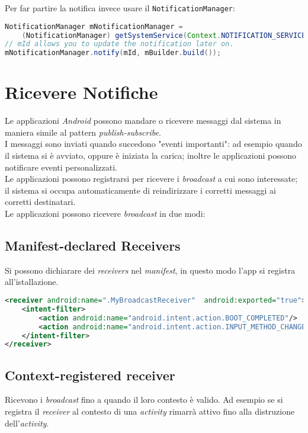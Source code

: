 Per far partire la notifica invece usare il \texttt{NotificationManager}:
\begin{lstlisting}[language=Java]
NotificationManager mNotificationManager =
    (NotificationManager) getSystemService(Context.NOTIFICATION_SERVICE);
// mId allows you to update the notification later on.
mNotificationManager.notify(mId, mBuilder.build());

\end{lstlisting}

\section{Ricevere Notifiche}
Le applicazioni \textit{Android} possono mandare o ricevere messaggi dal sistema in maniera simile al pattern \textit{publish-subscribe}.\\
I messaggi sono inviati quando succedono "eventi importanti": ad esempio quando il sistema si è avviato, oppure è iniziata la carica; inoltre le applicazioni possono notificare eventi personalizzati.\\
Le applicazioni possono registrarsi per ricevere i \textit{broadcast} a cui sono interessate; il sistema si occupa automaticamente di reindirizzare i corretti messaggi ai corretti destinatari.\\
Le applicazioni possono ricevere \textit{broadcast} in due modi:

\subsection{Manifest-declared Receivers}
Si possono dichiarare dei \textit{receivers} nel \textit{manifest}, in questo modo l'app si registra all'istallazione.
\begin{lstlisting}[language=XML]
<receiver android:name=".MyBroadcastReceiver"  android:exported="true">
    <intent-filter>
        <action android:name="android.intent.action.BOOT_COMPLETED"/>
        <action android:name="android.intent.action.INPUT_METHOD_CHANGED" />
    </intent-filter>
</receiver> 
\end{lstlisting}


\subsection{Context-registered receiver}
Ricevono i \textit{broadcast} fino a quando il loro contesto è valido. Ad esempio se si registra il \textit{receiver} al contesto di una \textit{activity} rimarrà attivo fino alla distruzione dell'\textit{activity}.\\

